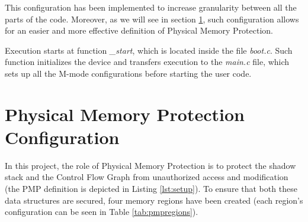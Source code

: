 This configuration has been implemented to increase granularity between all the
parts of the code. Moreover, as we will see in section \ref{sec:project_pmp}, such
configuration allows for an easier and more effective definition of Physical Memory
Protection.

Execution starts at function \textit{\_start}, which is located inside the file \textit{boot.c}.
Such function initializes the device and transfers execution to the \textit{main.c}
file, which sets up all the M-mode configurations before starting the user code.

\section{Physical Memory Protection Configuration}
\label{sec:project_pmp}

In this project, the role of Physical Memory Protection is to protect the shadow
stack and the Control Flow Graph from unauthorized access and modification (the
PMP definition is depicted in Listing \ref{lst:setup}). To ensure that both
these data structures are secured, four memory regions have been created (each
region's configuration can be seen in Table \ref{tab:pmpregions}).

